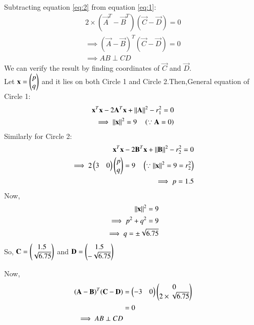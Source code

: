 \documentclass[journal,12pt,twocolumn]{IEEEtran}
\begin{document}
Subtracting equation \ref{eq:2} from equation \ref{eq:1}:
\begin{align}
2\times(\vec{A}^T-\vec{B}^T)(\vec{C}-\vec{D})=0
\\
\implies (\vec{A}-\vec{B})^T(\vec{C}-\vec{D})=0
\\
\implies AB\perp CD
\end{align}
We can verify the result by finding coordinates of $\vec{C}$ and $\vec{D}$.
\\Let $\mathbf{x}=\begin{pmatrix}p\\q\end{pmatrix}$ and it lies on both Circle 1 and Circle 2.Then,General equation of Circle 1:
\begin{align}
\mathbf{x}^T\mathbf{x} - 2\mathbf{A}^T\mathbf{x} + \lVert\mathbf{A}\rVert^2 -r_{1}^2 = 0
\\
\implies \lVert\mathbf{x}\rVert^2=9\quad \left(\because \mathbf{A}=0\right)
\end{align}
Similarly for Circle 2:
\begin{align}
\mathbf{x}^T\mathbf{x} - 2\mathbf{B}^T\mathbf{x} + \lVert\mathbf{B}\rVert^2 -r_{2}^2 = 0
\\
\implies 2\begin{pmatrix}3&0\end{pmatrix}\begin{pmatrix}p\\q\end{pmatrix}=9\quad \left(\because \lVert\mathbf{x}\rVert^2=9=r_{2}^2\right)
\\
\implies p=1.5
\end{align}
Now,
\begin{align}
\lVert\mathbf{x}\rVert^2=9
\\
\implies p^2+q^2=9
\\
\implies q=\pm{\sqrt{6.75}}
\end{align}
So, $\mathbf{C}=\begin{pmatrix}1.5\\\sqrt{6.75}\end{pmatrix}$ and $\mathbf{D}=\begin{pmatrix}1.5\\-\sqrt{6.75}\end{pmatrix}$

Now,
\begin{align}
(\mathbf{A}-\mathbf{B})^T(\mathbf{C}-\mathbf{D})
&=\begin{pmatrix}-3&0\end{pmatrix}\begin{pmatrix}0\\2\times\sqrt{6.75}\end{pmatrix}
\\
&=0
\\
\implies AB\perp CD
\end{align}
\end{document}
